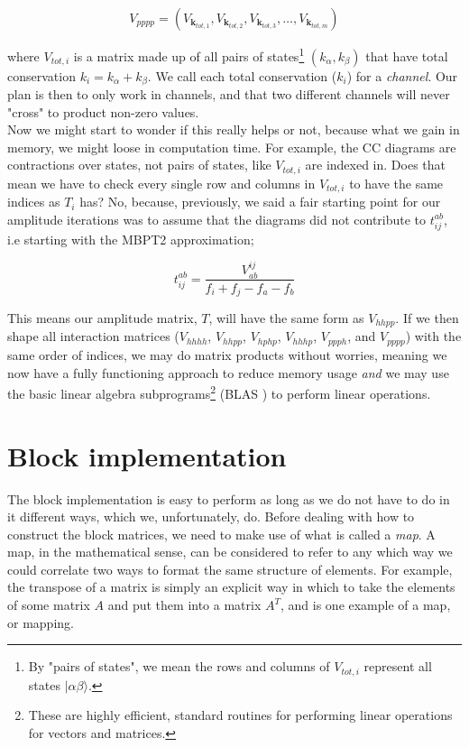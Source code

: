 \documentclass[10pt,twoside]{report}
\begin{document}
	\begin{equation}
		V_{pppp} = \left( V_{\bm{k}_{tot,1}}, V_{\bm{k}_{tot,2}}, V_{\bm{k}_{tot,3}}, \ldots, V_{\bm{k}_{tot,m}}\right)
	\end{equation}
	
	where $V_{tot,i}$ is a matrix made up of all pairs of states\footnote{By "pairs of states", we mean the rows and columns of $V_{tot,i}$ represent all states $|\alpha\beta\rangle$.} $(k_\alpha, k_\beta)$ that have total conservation $k_i = k_\alpha + k_\beta$. We call each total conservation ($k_i$) for a \emph{channel}. Our plan is then to only work in channels, and that two different channels will never "cross" to product non-zero values.\\
	
	Now we might start to wonder if this really helps or not, because what we gain in memory, we might loose in computation time. For example, the CC diagrams are contractions over states, not pairs of states, like $V_{tot,i}$ are indexed in. Does that mean we have to check every single row and columns in $V_{tot,i}$ to have the same indices as $T_{i}$ has? No, because, previously, we said a fair starting point for our amplitude iterations was to assume that the diagrams did not contribute to $t_{ij}^{ab}$, i.e starting with the MBPT2 approximation;
	
	\begin{equation}
		t_{ij}^{ab} = \frac{V_{ab}^{ij}}{f_i + f_j - f_a - f_b}
	\end{equation}
	
	This means our amplitude matrix, $T$, will have the same form as $V_{hhpp}$. If we then shape all interaction matrices ($V_{hhhh}$, $V_{hhpp}$, $V_{hphp}$, $V_{hhhp}$, $V_{ppph}$, and $V_{pppp}$) with the same order of indices, we may do matrix products without worries, meaning we now have a fully functioning approach to reduce memory usage \emph{and} we may use the basic linear algebra subprograms\footnote{These are highly efficient, standard routines for performing linear operations for vectors and matrices.} (BLAS \cite{blas}) to perform linear operations.
	
	\section{Block implementation}
	\label{Implementation | sec | "Block implementation"}
	The block implementation is easy to perform as long as we do not have to do in it different ways, which we, unfortunately, do. Before dealing with how to construct the block matrices, we need to make use of what is called a \emph{map}. A map, in the mathematical sense, can be considered to refer to any which way we could correlate two ways to format the same structure of elements. For example, the transpose of a matrix is simply an explicit way in which to take the elements of some matrix $A$ and put them into a matrix $A^T$, and is one example of a map, or mapping.\\
	
\end{document}
